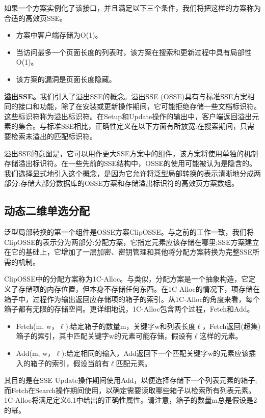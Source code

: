 \documentclass[UTF8]{article}
\begin{document}
如果一个方案实例化了该接口，并且满足以下三个条件，我们将把这样的方案称为合适的高效页SSE。

\begin{itemize}
  \item 方案中客户端存储为O(1)。
  \item 当访问最多一个页面长度的列表时，该方案在搜索和更新过程中具有局部性O(1)。
  \item 该方案的漏洞是页面长度隐藏。
\end{itemize}
\textbf{溢出SSE。}我们引入了溢出SSE的概念。溢出SSE (OSSE)具有与标准SSE方案相同的接口和功能，除了在安装或更新操作期间，它可能拒绝存储一些文档标识符。这些标识符称为溢出标识符。在Setup和Update操作的输出中，客户端返回溢出元素的集合。与标准SSE相比，正确性定义在以下方面有所放宽:在搜索期间，只需要检索未溢出的匹配标识符。

溢出SSE的意图是，它可以用作更大SSE方案中的组件，该方案将使用单独的机制存储溢出标识符。在一些先前的SSE结构中，OSSE的使用可能被认为是隐含的。我们选择显式地引入这个概念，是因为它允许将泛型局部转换的表示清晰地分成两部分:存储大部分数据库的OSSE方案和存储溢出标识符的高效页方案数组。

\subsection{动态二维单选分配}
泛型局部转换的第一个组件是OSSE方案ClipOSSE。与之前的工作一致，我们将ClipOSSE的表示分为两部分:分配方案，它指定元素应该存储在哪里;SSE方案建立在它的基础上，它增加了一层加密、密钥管理和其他将分配方案转换为完整SSE所需的机制。

ClipOSSE中的分配方案称为1C-Alloc。与\cite{GiladAsharov2021SearchableSE}类似，分配方案是一个抽象构造，它定义了存储项的内存位置，但本身不存储任何东西。在1C-Alloc的情况下，项存储在箱子中，过程作为输出返回应存储项的箱子的索引。从1C-Alloc的角度来看，每个箱子都有无限的存储空间。更详细地说，1C-Alloc包含两个过程，Fetch和Add。

\begin{itemize}
  \item Fetch(m, w，$\ell$):给定箱子的数量m，关键字w和列表长度$\ell$，Fetch返回(超集)箱子的索引，其中匹配关键字w的元素可能存储，假设有$\ell$这样的元素。
  \item Add(m, w，$\ell$):给定相同的输入，Add返回下一个匹配关键字w的元素应该插入的箱子的索引，假设当前有$\ell$匹配元素。
\end{itemize}

其目的是在SSE Update操作期间使用Add，以便选择存储下一个列表元素的箱子;而Fetch在Search操作期间使用，以确定需要读取哪些箱子以检索所有列表元素。1C-Alloc将满足定义6.1中给出的正确性属性。请注意，箱子的数量m总是假设是2的幂。
\end{document}
